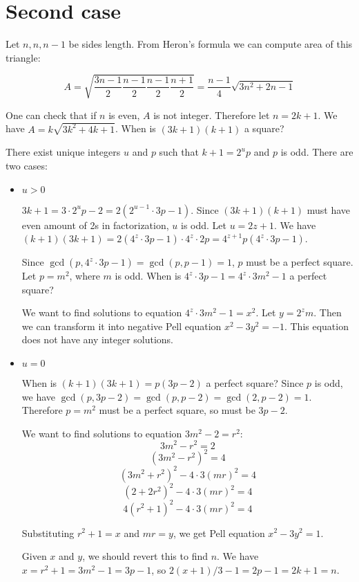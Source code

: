 \documentclass[a4paper,12pt]{article}
\begin{document}
\section*{Second case}

Let \(n, n, n - 1\) be sides length.
From Heron's formula we can compute area of this triangle:

\[A = \sqrt{\frac{3n - 1}{2} \frac{n - 1}{2}
\frac{n - 1}{2} \frac{n + 1}{2}} = \frac{n - 1}{4} \sqrt{3n^2 + 2n - 1}\]

One can check that if \(n\) is even, \(A\) is not integer.
Therefore let \(n = 2k + 1\). We have
\(A = k \sqrt{3k^2 + 4k + 1}\). When is \((3k + 1)(k + 1)\) a square?

There exist unique integers \(u\) and \(p\) such that \(k + 1 = 2^up\) and
\(p\) is odd. There are two cases:
\begin{itemize}
\item \(u > 0\)

\(3k + 1 = 3 \cdot 2^up - 2 = 2(2^{u - 1} \cdot 3p - 1)\).
Since \((3k + 1)(k + 1)\) must have even amount of 2s in factorization,
\(u\) is odd. Let \(u = 2z + 1\). We have \((k + 1)(3k + 1) =
2(4^z \cdot 3p - 1) \cdot 4^z \cdot 2p = 4^{z + 1} p(4^z \cdot 3p - 1)\).

Since \(\gcd(p, 4^z \cdot 3p - 1) = \gcd(p, p - 1) = 1\),
\(p\) must be a perfect square. Let \(p = m^2\), where \(m\) is odd.
When is \(4^z \cdot 3p - 1 = 4^z \cdot 3m^2 - 1\) a perfect square?

We want to find solutions to equation \(4^z \cdot 3m^2 - 1 = x^2\).
Let \(y = 2^zm\). Then we can transform it into negative Pell equation
\(x^2 - 3y^2 = -1\). This equation does not have any integer solutions.

\item \(u = 0\)

When is \((k + 1)(3k + 1) = p(3p - 2)\) a perfect square? Since \(p\) is odd,
we have \(\gcd(p, 3p - 2) = \gcd(p, p - 2) = \gcd(2, p - 2) = 1\).
Therefore \(p = m^2\) must be a perfect square, so must be \(3p - 2\).

We want to find solutions to equation \(3m^2 - 2 = r^2\):
\[3m^2 - r^2 = 2\]
\[(3m^2 - r^2)^2 = 4\]
\[(3m^2 + r^2)^2 - 4 \cdot 3 (mr)^2 = 4\]
\[(2 + 2r^2)^2 - 4 \cdot 3(mr)^2 = 4\]
\[4(r^2 + 1)^2 - 4 \cdot 3(mr)^2 = 4\]

Substituting \(r^2 + 1 = x\) and \(mr = y\), we get
Pell equation \(x^2 - 3y^2 = 1\). 

Given \(x\) and \(y\), we should revert this to find \(n\).
We have \(x = r^2 + 1 = 3m^2 - 1 = 3p - 1\), so
\(2 (x + 1) / 3 - 1 = 2p - 1 = 2k + 1 = n\).


\end{itemize}
\end{document}

